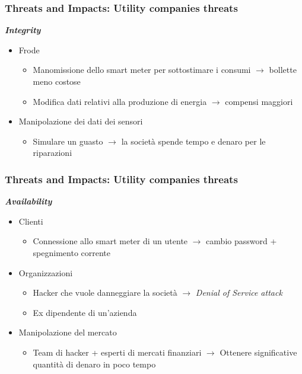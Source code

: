 \begin{frame}
  \frametitle{Threats and Impacts: Utility companies threats}
  \textbf{\textit{Integrity}}
  \begin{itemize}[<+- | alert@+>]
	  \item Frode
	  \begin{itemize}
	  \item Manomissione dello smart meter per sottostimare i consumi $\rightarrow$ bollette meno costose 
	  \item Modifica dati relativi alla produzione di energia $\rightarrow$ compensi maggiori
	  \end{itemize}
	\item Manipolazione dei dati dei sensori
		\begin{itemize}
		\item Simulare un guasto $\rightarrow$ la società spende tempo e denaro per le riparazioni
		\end{itemize}
 	\end{itemize}
\end{frame}

\begin{frame}
  \frametitle{Threats and Impacts: Utility companies threats}
  \textbf{\textit{Availability}}
  \begin{itemize}[<+- | alert@+>]
	\item Clienti
	  	\begin{itemize}
	  	\item Connessione allo smart meter di un utente $\rightarrow$ cambio password + spegnimento corrente
	  	\end{itemize}
	\item Organizzazioni
			\begin{itemize}
			\item Hacker che vuole danneggiare la società $\rightarrow$ \textit{Denial of Service attack}
			\item Ex dipendente di un'azienda
			\end{itemize}
	\item Manipolazione del mercato
		\begin{itemize}
		\item Team di hacker + esperti di mercati finanziari $\rightarrow$ Ottenere significative quantità di denaro in poco tempo
		\end{itemize}
 	\end{itemize}
\end{frame}

